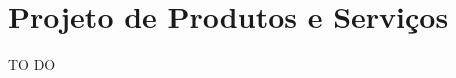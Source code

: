 \chapter[Projeto de Produtos e Serviços]{Projeto de Produtos e Serviços}
\label{chap:produtos}

	TO DO